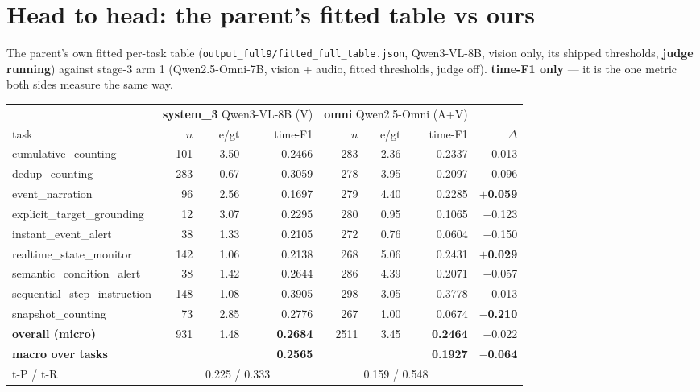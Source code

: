 \documentclass[11pt,a4paper]{article}
\begin{document}
\section{Head to head: the parent's fitted table vs ours}

The parent's own fitted per-task table (\texttt{output\_full9/fitted\_full\_table.json},
Qwen3-VL-8B, vision only, its shipped thresholds, \textbf{judge running}) against stage-3
arm 1 (Qwen2.5-Omni-7B, vision + audio, fitted thresholds, judge off). \textbf{time-F1
only} --- it is the one metric both sides measure the same way.

\begin{center}\small
\begin{tabular}{lrrr@{\hskip 1.2em}rrr@{\hskip 1.2em}r}
\toprule
& \multicolumn{3}{c}{\textbf{system\_3} Qwen3-VL-8B (V)} &
  \multicolumn{3}{c}{\textbf{omni} Qwen2.5-Omni (A+V)} & \\
\cmidrule(r){2-4}\cmidrule(r){5-7}
task & $n$ & e/gt & time-F1 & $n$ & e/gt & time-F1 & $\Delta$ \\
\midrule
cumulative\_counting          & 101 & 3.50 & 0.2466 & 283 & 2.36 & 0.2337 & $-$0.013 \\
dedup\_counting               & 283 & 0.67 & 0.3059 & 278 & 3.95 & 0.2097 & $-$0.096 \\
event\_narration              &  96 & 2.56 & 0.1697 & 279 & 4.40 & 0.2285 & \textbf{$+$0.059} \\
explicit\_target\_grounding   &  12 & 3.07 & 0.2295 & 280 & 0.95 & 0.1065 & $-$0.123 \\
instant\_event\_alert         &  38 & 1.33 & 0.2105 & 272 & 0.76 & 0.0604 & $-$0.150 \\
realtime\_state\_monitor      & 142 & 1.06 & 0.2138 & 268 & 5.06 & 0.2431 & \textbf{$+$0.029} \\
semantic\_condition\_alert    &  38 & 1.42 & 0.2644 & 286 & 4.39 & 0.2071 & $-$0.057 \\
sequential\_step\_instruction & 148 & 1.08 & 0.3905 & 298 & 3.05 & 0.3778 & $-$0.013 \\
snapshot\_counting            &  73 & 2.85 & 0.2776 & 267 & 1.00 & 0.0674 & $-$\textbf{0.210} \\
\midrule
\textbf{overall (micro)}      & 931 & 1.48 & \textbf{0.2684} & 2511 & 3.45 & \textbf{0.2464} & $-$0.022 \\
\textbf{macro over tasks}     &     &      & \textbf{0.2565} &      &      & \textbf{0.1927} & $-$\textbf{0.064} \\
\midrule
t-P / t-R                     & \multicolumn{3}{c}{0.225 / 0.333} & \multicolumn{3}{c}{0.159 / 0.548} & \\
\bottomrule
\end{tabular}
\end{center}
\end{document}
